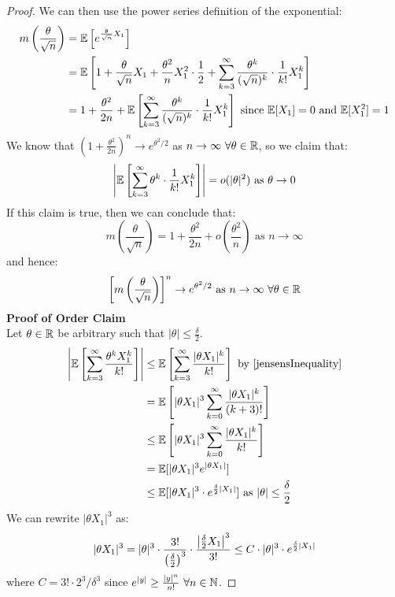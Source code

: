 \documentclass[../main.tex]{subfiles}
\begin{document}
\begin{proof}
  We can then use the power series definition of the exponential:
  \begin{align*}
    m\left(\frac{\theta}{\sqrt{n}}\right) &= \mathbb{E}\left[e^{\frac{\theta}{\sqrt{n}}X_1}\right] \\
                                          &= \mathbb{E}\left[1 + \frac{\theta}{\sqrt{n}}X_1 + \frac{\theta^2}{n}X^2_1 \cdot \frac{1}{2} + \sum_{k = 3}^{\infty} \frac{\theta^{k}}{(\sqrt{n})^{k}} \cdot \frac{1}{k!}X^{k}_1\right] \\
                                          &= 1 + \frac{\theta^2}{2n} + \mathbb{E}\left[\sum_{k = 3}^{\infty} \frac{\theta^{k}}{(\sqrt{n})^{k}} \cdot \frac{1}{k!}X^{k}_1\right] \text{ since $\mathbb{E}[X_1] = 0$ and $\mathbb{E}[X^2_1] = 1$}
  \end{align*}
  We know that $(1 + \frac{\theta^2}{2n})^{n} \to e^{\theta^2/2}$ as $n \to \infty\ \forall \theta \in \mathbb{R}$, so we claim that:
  \[
    \left\lvert \mathbb{E}\left[\sum_{k =  3}^{\infty} \theta^{k} \cdot \frac{1}{k!}X^{k}_1\right] \right\rvert = o(|\theta|^2) \text{ as } \theta \to 0
  \]
  If this claim is true, then we can conclude that:
  \[
    m\left(\frac{\theta}{\sqrt{n}}\right) = 1 + \frac{\theta^2}{2n} + o\left(\frac{\theta^2}{n}\right) \text{ as $n \to \infty$}
  \]
  and hence:
  \[
    \left[m\left(\frac{\theta}{\sqrt{n}}\right)\right]^{n} \to e^{\theta^2 / 2} \text{ as } n \to \infty\ \forall \theta \in \mathbb{R}
  \]
  \textbf{Proof of Order Claim}\\
  Let $\theta \in \mathbb{R}$ be arbitrary such that $|\theta| \leq \frac{\delta}{2}$.
  \begin{align*}
    \abs{\E\left[\sum_{k = 3}^{\infty} \frac{\theta^{k}X^{k}_1}{k!}\right]} &\leq \E\left[\sum_{k = 3}^{\infty} \frac{|\theta X_1|^{k}}{k!}\right] \text{ by \cref{jensensInequality}} \\
                                                                            &= \E\left[|\theta X_1|^3 \sum_{k = 0}^{\infty} \frac{|\theta X_1|^{k}}{(k + 3)!}\right] \\
                                                                            &\leq \E\left[|\theta X_1|^3 \sum_{k = 0}^{\infty} \frac{|\theta X_1|^{k}}{k!}\right] \\
                                                                            &= \E[|\theta X_1|^3 e^{|\theta X_1|}] \\
                                                                            &\leq \E[|\theta X_1|^3 \cdot e^{\frac{\delta}{2}|X_1|}] \text{ as $|\theta| \leq \frac{\delta}{2}$}
  \end{align*}
  We can rewrite $|\theta X_1|^3$ as:
  \[
    |\theta X_1|^3 = |\theta|^3 \cdot \frac{3!}{\left(\frac{\delta}{2}\right)^3} \cdot \frac{\left\lvert \frac{\delta}{2} X_1 \right\rvert^3}{3!} \leq C \cdot |\theta|^3 \cdot e^{\frac{\delta}{2}|X_1|}
  \]
  where $C = 3! \cdot 2^{3}/\delta^{3}$ since $e^{|y|} \geq \frac{|y|^{n}}{n!}\ \forall n \in \N$.


\end{proof}
\end{document}
